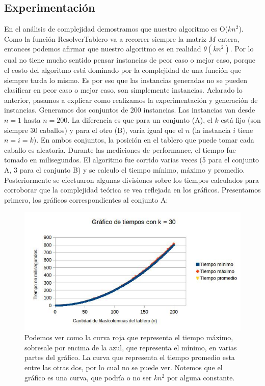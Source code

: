 \documentclass[a4paper]{article}
\begin{document}
\subsection{Experimentación}
En el análisis de complejidad demostramos que nuestro algoritmo es O($kn^2$). Como la función ResolverTablero va a recorrer siempre la matriz $M$ entera, entonces podemos afirmar que nuestro algoritmo es en realidad $\theta(kn^2)$. Por lo cual no tiene mucho sentido pensar instancias de peor caso o mejor caso, porque el costo del algoritmo está dominado por la complejidad de una función que siempre tarda lo mismo. Es por eso que las instancias generadas no se pueden clasificar en peor caso o mejor caso, son simplemente instancias.
\newline
\newline Aclarado lo anterior, pasamos a explicar como realizamos la experimentación y generación de instancias.
\newline Generamos dos conjuntos de 200 instancias. Las instancias van desde $n = 1$ hasta $n = 200$. La diferencia es que para un conjunto (A), el $k$ está fijo (son siempre 30 caballos) y para el otro (B), varía igual que el $n$ (la instancia $i$ tiene $n = i = k$). En ambos conjuntos, la posición en el tablero que puede tomar cada caballo es aleatoria.
\newline Durante las mediciones de performance, el tiempo fue tomado en milisegundos. El algoritmo fue corrido varias veces (5 para el conjunto A, 3 para el conjunto B) y se calculo el tiempo mínimo, máximo y promedio. Posteriormente se efectuaron algunas divisiones sobre los tiempos calculados para corroborar que la complejidad teórica se vea reflejada en los gráficos.
\newline
\newline Presentamos primero, los gráficos correspondientes al conjunto A:
\begin{figure}[h!]
\centering
\includegraphics[width=\textwidth]{conjAcurva.jpg}\caption{Podemos ver como la curva roja que representa el tiempo máximo, sobresale por encima de la azul, que representa el mínimo, en varias partes del gráfico. La curva que representa el tiempo promedio esta entre las otras dos, por lo cual no se puede ver. Notemos que el gráfico es una curva, que podría o no ser $kn^2$ por alguna constante.}
\end{figure}
\end{document}
